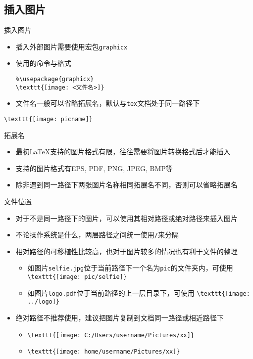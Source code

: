 \subsection{插入图片}
\begin{frame}[fragile]{插入图片}
	\begin{itemize}
		\item 插入外部图片需要使用宏包\texttt{graphicx}
		\item 使用的命令与格式\\
\begin{lstlisting}
%\usepackage{graphicx}
\texttt{[image: <文件名>]}
\end{lstlisting}
		\item 文件名一般可以省略拓展名，默认与\texttt{tex}文档处于同一路径下 
	\end{itemize}
	\begin{center}
	\verb|\texttt{[image: picname]}|
	\end{center}
\end{frame}
\begin{frame}{拓展名}
	\begin{itemize}
		\item 最初\LaTeX 支持的图片格式有限，往往需要将图片转换格式后才能插入
		\item \XeLaTeX 支持的图片格式有\textrm{EPS, PDF, PNG, JPEG, BMP}等
		\item 除非遇到同一路径下两张图片名称相同拓展名不同，否则可以省略拓展名
	\end{itemize}
\end{frame}
\begin{frame}[fragile]{文件位置}
	\begin{itemize}
		\item 对于不是同一路径下的图片，可以使用其相对路径或绝对路径来插入图片
		\item 不论操作系统是什么，两层路径之间统一使用\texttt{/}来分隔
		\item 相对路径的可移植性比较高，也对于图片较多的情况也有利于文件的整理
		\begin{itemize}
			\item 如图片\texttt{selfie.jpg}位于当前路径下一个名为\texttt{pic}的文件夹内，可使用 \verb|\texttt{[image: pic/selfie]}|
			\item 如图片\texttt{logo.pdf}位于当前路径的上一层目录下，可使用 \verb|\texttt{[image: ../logo]}|
		\end{itemize}
		\item 绝对路径不推荐使用，建议把图片复制到文档同一路径或相近路径下
		\begin{itemize}
			\item \verb|\texttt{[image: C:/Users/username/Pictures/xx]}|
			\item \verb|\texttt{[image: home/username/Pictures/xx]}|
		\end{itemize}
	\end{itemize}
\end{frame}

